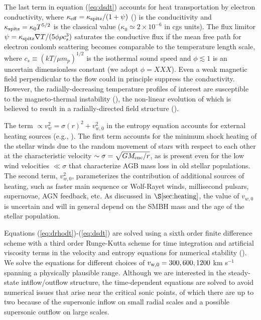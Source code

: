 \documentclass[usenatbib,fleqn]{mn2e}
\newcommand{\vw}{v_w}
\begin{document}
The last term in equation (\ref{eq:dsdt}) accounts for heat transportation by electron conductivity, where $\kappa_{\rm eff}=\kappa_{\rm spitz}/(1+\psi)$ (\citealt{DaltonBalbus:1993a}) is the conducitivity and $\kappa_{\rm spitz} = \kappa_0 T^{5/2}$ is the classical \citet{Spitzer62} value ($\kappa_0\simeq 2\times 10^{-6}$ in cgs units).  The flux limitor $\psi = \kappa_{\rm spitz} \nabla T/(5\phi \rho c_s^3)$ saturates the conductive flux if the mean free path for electron coulomb scattering becomes comparable to the temperature length scale, where $c_s \equiv (kT/\mu m_p)^{1/2}$ is the isothermal sound speed and $\phi \lesssim 1$ is an uncertain dimensionless constant (we adopt $\phi = XXX$).  Even a weak magnetic field perpendicular to the flow could in principle suppress the conductivity.  However, the radially-decreasing temperature profiles of interest are susceptible to the magneto-thermal instability (\citealt{Balbus01}), the non-linear evolution of which is believed to result in a radially-directed field structure (\citealt{Parrish&Stone07}).

The term $\propto \vw^2 = \sigma(r)^2+v_{w,0}^2$ in the entropy equation accounts for external heating sources (e.g., \citealt{ShcherbakovWong+:2014a}).  The first term accounts for the minimum shock heating of the stellar winds due to the random movement of stars with respect to each other at the characteristic velocity $\sim \sigma = \sqrt{GM_{\rm enc}/r}$, as is present even for the low wind velocities $\ll \sigma$ that characterize AGB mass loss in old stellar populations.  The second term, $v_{w,0}^{2}$, parameterizes the contribution of additional sources of heating, such as faster main sequence or Wolf-Rayet winds, millisecond pulsars, supernovae, AGN feedback, etc.  As discussed in $\S\ref{sec:heating}$, the value of $v_{w,0}$ is uncertain and will in general depend on the SMBH mass and the age of the stellar population.

Equations (\ref{eq:drhodt})-(\ref{eq:dsdt}) are solved using a sixth
order finite difference scheme with a third order Runge-Kutta scheme
for time integration and artificial viscosity terms in the velocity
and entropy equations for numerical stability (\citealt{Brandenburg:2003a}).  We solve the equations for different choices of $v_{\rm w,0} = 300, 600, 1200$ km s$^{-1}$ spanning a physically plausible
range.  Although we are interested in the steady-state intflow/outflow structure, the time-dependent equations are solved to avoid numerical issues that arise near the critical sonic points, of which there are up to two because of the supersonic inflow on small radial scales and a possible supersonic outflow on large scales.
\end{document}

